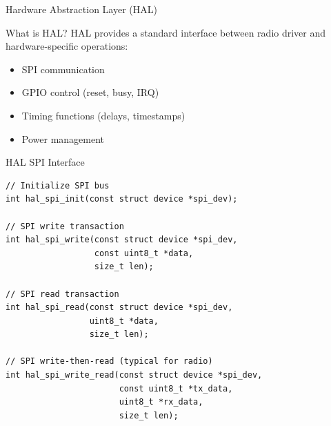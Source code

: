 \documentclass{beamer}
\begin{document}
\begin{frame}{Hardware Abstraction Layer (HAL)}
\begin{block}{What is HAL?}
HAL provides a standard interface between radio driver and hardware-specific operations:
\begin{itemize}
    \item SPI communication
    \item GPIO control (reset, busy, IRQ)
    \item Timing functions (delays, timestamps)
    \item Power management
\end{itemize}
\end{block}

\vspace{0.3cm}

\begin{center}
\end{center}
\end{frame}

\begin{frame}[fragile]{HAL SPI Interface}
\begin{lstlisting}[caption={SPI HAL Functions}]
// Initialize SPI bus
int hal_spi_init(const struct device *spi_dev);

// SPI write transaction
int hal_spi_write(const struct device *spi_dev,
                  const uint8_t *data,
                  size_t len);

// SPI read transaction
int hal_spi_read(const struct device *spi_dev,
                 uint8_t *data,
                 size_t len);

// SPI write-then-read (typical for radio)
int hal_spi_write_read(const struct device *spi_dev,
                       const uint8_t *tx_data,
                       uint8_t *rx_data,
                       size_t len);
\end{lstlisting}
\end{frame}
\end{document}
